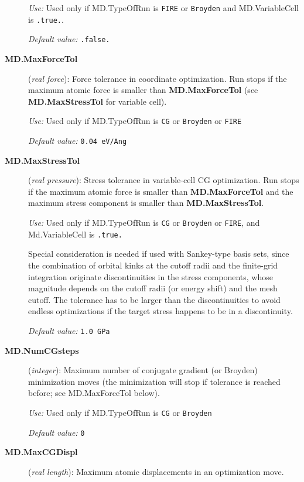\begin{description}
\textit{Use:} Used only if MD.TypeOfRun is \texttt{FIRE} or \texttt{Broyden}  and
 MD.VariableCell is \texttt{.true.}.

\textit{Default value:} \texttt{.false.}

\item[\textbf{MD.MaxForceTol}] (\textit{real force}):
Force tolerance in coordinate optimization.
Run stops if the maximum atomic force is
smaller than \textbf{MD.MaxForceTol} (see \textbf{MD.MaxStressTol}
for variable cell).

\textit{Use:} Used only if MD.TypeOfRun is \texttt{CG} or \texttt{Broyden} or
\texttt{FIRE}

\textit{Default value:} \texttt{0.04 eV/Ang}


\item[\textbf{MD.MaxStressTol}] (\textit{real pressure}):
Stress tolerance in variable-cell CG optimization. Run stops
if the maximum atomic force is smaller than \textbf{MD.MaxForceTol}
and the maximum stress component is smaller than \textbf{MD.MaxStressTol}.

\textit{Use:} Used only if MD.TypeOfRun is \texttt{CG} or \texttt{Broyden} or
\texttt{FIRE}, and Md.VariableCell is \texttt{.true.}

Special consideration is needed if used with Sankey-type basis sets, since
the combination of orbital kinks at the cutoff radii and the finite-grid
integration originate discontinuities in the
stress components, whose magnitude depends on the cutoff radii (or
energy shift) and the mesh cutoff. The tolerance has to be larger
than the discontinuities to avoid endless optimizations if the target
stress happens to be in a discontinuity.

\textit{Default value:} \texttt{1.0 GPa}


\item[\textbf{MD.NumCGsteps}] (\textit{integer}):
Maximum number of conjugate gradient (or Broyden) minimization
moves (the minimization will stop
if tolerance is reached before; see MD.MaxForceTol below).

\textit{Use:} Used only if MD.TypeOfRun is \texttt{CG} or \texttt{Broyden}

\textit{Default value:} \texttt{0}

\item[\textbf{MD.MaxCGDispl}] (\textit{real length}):
Maximum atomic displacements in an optimization move.


\end{description}
